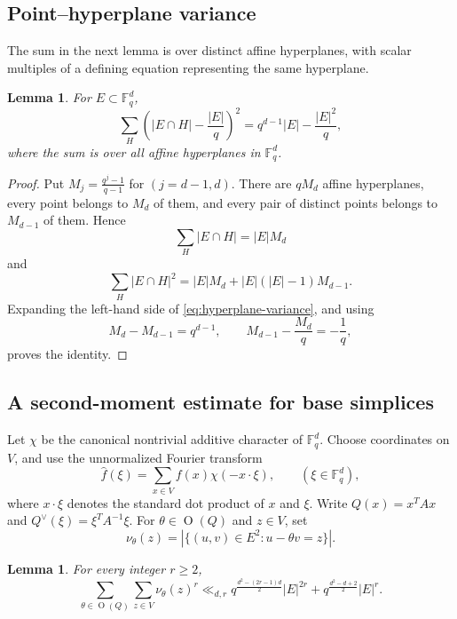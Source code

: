 \documentclass[11pt]{article}
\newtheorem{lemma}[theorem]{Lemma}
\theoremstyle{remark}
\newcommand{\wh}{\widehat}
\numberwithin{equation}{section}
\newcommand{\Fq}{\mathbb F_q}
\newcommand{\Orth}{\operatorname O}
\newcommand{\1}{\mathbf 1}
\begin{document}
\subsection{Point--hyperplane variance}

The sum in the next lemma is over distinct affine hyperplanes, with scalar multiples of a defining equation representing the same hyperplane.

\begin{lemma} 
\label{lem:hyperplane-variance}
For \(E\subset\Fq^d\),
\begin{equation}\label{eq:hyperplane-variance}
\sum_H\left(|E\cap H|-\frac{|E|}{q}\right)^2  = q^{d-1}|E|-\frac{|E|^2}{q},
\end{equation}
where the sum is over all affine hyperplanes in $\Fq^d$. 
\end{lemma}

\begin{proof}
Put $M_j=\frac{q^j-1}{q-1}$ for $(j=d-1,d)$. There are \(qM_d\) affine hyperplanes, every point belongs to \(M_d\)
of them, and every pair of distinct points belongs to \(M_{d-1}\) of
them. Hence
\[
        \sum_H|E\cap H|=|E|M_d
\]
and
\[
        \sum_H|E\cap H|^2
        =
        |E|M_d+|E|(|E|-1)M_{d-1}.
\]
Expanding the left-hand side of \eqref{eq:hyperplane-variance}, and
using
\[
        M_d-M_{d-1}=q^{d-1},
        \qquad
        M_{d-1}-\frac{M_d}{q}=-\frac1q,
\]
proves the identity.
\end{proof}

\subsection{A second-moment estimate for base simplices}

Let \(\chi\) be the canonical nontrivial additive character of \(\Fq^d\). Choose coordinates on \(V\), and use the unnormalized Fourier transform
\[
\wh f(\xi) = \sum_{x\in V}f(x)\chi(-x\cdot\xi),\qquad (\xi\in \Fq^d),
\]
where $x\cdot \xi$ denotes the standard dot product of $x$ and $\xi$. 
Write \(Q(x)=x^TAx\) and $Q^\vee(\xi)=\xi^TA^{-1}\xi$. For \(\theta\in\Orth(Q)\) and \(z\in V\), set
\[
 \nu_\theta(z)
 =
 |\{(u,v)\in E^2:u-\theta v=z\}|.
\]

\begin{lemma} \label{lem:BHIPR-motion-moment}
For every integer $r\geq 2$,
\begin{equation}\label{eq:BHIPR-motion-moment}
\sum_{\theta\in\Orth(Q)}\sum_{z\in V}\nu_\theta(z)^r
\ll_{d,r}
q^{\frac{d^2-(2r-1)d}{2}}|E|^{2r}
+
q^{\frac{d^2-d+2}{2}}|E|^r.
\end{equation}
\end{lemma}
\end{document}
